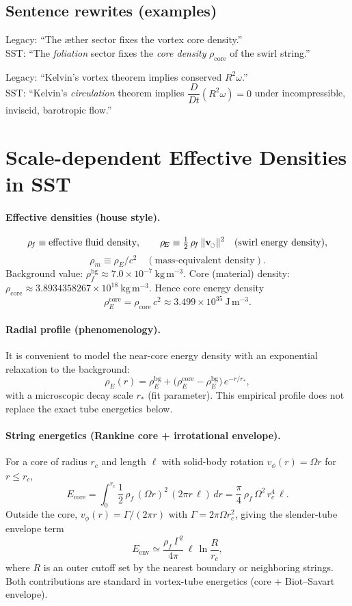 \documentclass[11pt]{article}
\newcommand{\swirlarrow}{%
	\mathchoice{\mkern-2mu\scriptstyle\boldsymbol{\circlearrowleft}}%
	{\mkern-2mu\scriptstyle\boldsymbol{\circlearrowleft}}%
	{\mkern-2mu\scriptscriptstyle\boldsymbol{\circlearrowleft}}%
	{\mkern-2mu\scriptscriptstyle\boldsymbol{\circlearrowleft}}%
}
\newcommand{\vswirl}{\mathbf{v}_{\swirlarrow}}
\newcommand{\vnorm}{\lVert \vswirl \rVert}               %
\newcommand{\rhoF}{\rho_{\!f}}                           %
\newcommand{\rhoE}{\rho_{\!E}}                           %
\newcommand{\rhoM}{\rho_{\!m}}                           %
\newcommand{\rhoC}{\rho_{\mathrm{core}}} %
\begin{document}
	\subsection*{Sentence rewrites (examples)}
	Legacy: “The æther sector fixes the vortex core density.”\\
	SST: “The \emph{foliation} sector fixes the \emph{core density} $\rhoC$ of the swirl string.”

	Legacy: “Kelvin’s vortex theorem implies conserved $R^2\omega$.”\\
	SST: “Kelvin’s \emph{circulation} theorem implies $\dfrac{D}{Dt}(R^2\omega)=0$ under incompressible, inviscid, barotropic flow.”


	\section*{Scale-dependent Effective Densities in SST}
	\paragraph{Effective densities (house style).}
	\[
		\rhoF \equiv \text{effective fluid density},\qquad
		\rhoE \equiv \tfrac12\,\rhoF\,\vnorm^{2}\quad(\text{swirl energy density}),
	\]\[
	  	\rhoM \equiv \rhoE/c^{2}\quad(\text{mass-equivalent density}).
	\]
	Background value: $\rhoF^{\mathrm{bg}}\approx 7.0\times 10^{-7}\ \mathrm{kg\,m^{-3}}$.
	Core (material) density: $\rhoC\approx 3.8934358267\times 10^{18}\ \mathrm{kg\,m^{-3}}$.
	Hence core energy density
	\[
		\rhoE^{\text{core}}=\rhoC\,c^{2}\approx 3.499\times 10^{35}\ \mathrm{J\,m^{-3}}.
	\]

	\paragraph{Radial profile (phenomenology).}
	It is convenient to model the near-core energy density with an exponential relaxation to the background:
	\[
		\rhoE(r)=\rhoE^{\mathrm{bg}}+\bigl(\rhoE^{\text{core}}-\rhoE^{\mathrm{bg}}\bigr)\,e^{-r/r_\ast},
	\]
	with a microscopic decay scale $r_\ast$ (fit parameter). This empirical profile does not replace the exact tube energetics below.

	\paragraph{String energetics (Rankine core + irrotational envelope).}
	For a core of radius $r_c$ and length $\ell$ with solid-body rotation $v_\phi(r)=\Omega r$ for $r\le r_c$,
	\[
		E_{\text{core}}
		=\int_{0}^{r_c}\!\!\frac12\,\rhoF\,(\Omega r)^2\,(2\pi r\,\ell)\,dr
		=\frac{\pi}{4}\,\rhoF\,\Omega^2\,r_c^4\,\ell.
	\]
	Outside the core, $v_\phi(r)=\Gamma/(2\pi r)$ with $\Gamma=2\pi\Omega r_c^{2}$, giving the slender-tube envelope term
	\[
		E_{\text{env}}\simeq \frac{\rhoF\,\Gamma^2}{4\pi}\,\ell\,\ln\!\frac{R}{r_c},
	\]
	where $R$ is an outer cutoff set by the nearest boundary or neighboring strings. Both contributions are standard in vortex-tube energetics (core + Biot–Savart envelope).
\end{document}
